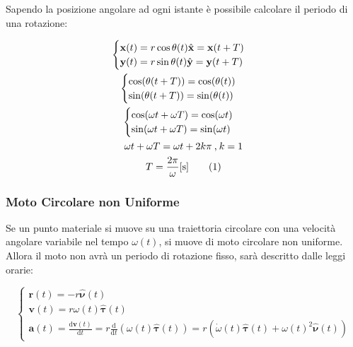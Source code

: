 \documentclass{article}
\newcommand{\vect}[1]{\boldsymbol{\mathbf{#1}}}
\newcommand{\df}{\mathrm{d}}
\numberwithin{equation}{subsection}
\begin{document}
Sapendo la posizione angolare ad ogni istante è possibile 
calcolare il periodo di una rotazione:

\begin{gather*}
    \begin{cases}
        \vect{x}(t)=r\cos\theta(t)\hat{\vect{x}}=\vect{x}(t+T)\\
        \vect{y}(t)=r\sin\theta(t)\hat{\vect{y}}=\vect{y}(t+T)
    \end{cases}\\
    \begin{cases}
        \cos(\theta(t+T))=\cos(\theta(t))\\
        \sin(\theta(t+T))=\sin(\theta(t))\\
    \end{cases}\\
    \begin{cases}
        \cos(\omega t +\omega T)=\cos(\omega t)\\
        \sin(\omega t + \omega T)=\sin(\omega  t)\\
    \end{cases}\\
    \omega t +\omega T =\omega t + 2k\pi\:\mbox{,}\:k=1\\
    T=\displaystyle\frac{2\pi}{\omega}[\mathrm{s}]\tag{\stepcounter{equation}\theequation}
\end{gather*}

\subsubsection{Moto Circolare non Uniforme}
Se un punto materiale si muove su una traiettoria circolare con 
una velocità angolare variabile nel tempo $\omega(t)$, si muove di moto 
circolare non uniforme. Allora il moto non avrà un periodo 
di rotazione fisso, sarà descritto dalle leggi orarie:

\begin{equation}
    \begin{cases}
        \vect{r}(t)=-r\hat{\vect{\nu}}(t)\\
        \vect{v}(t)=r\omega(t)\hat{\vect{\tau}}(t)\\
        \vect{a}(t)=\displaystyle\frac{\df\vect{v}(t)}{\df t}
        =r\frac{\df}{\df t}(\omega(t)\hat{\vect{\tau}}(t))
        =r(\dot\omega(t)\hat{\vect{\tau}}(t)+\omega(t)^{2}\hat{\vect{\nu}}(t))
    \end{cases}
\end{equation}
\end{document}
